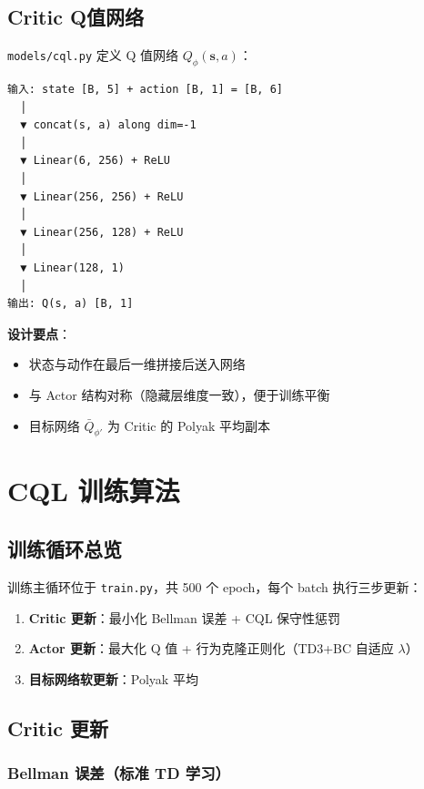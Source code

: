 \documentclass[11pt,a4paper]{ctexart}
\newcommand{\file}[1]{\texttt{#1}}
\begin{document}
\subsection{Critic Q值网络}

\file{models/cql.py} 定义 Q 值网络 $Q_{\phi}(\mathbf{s}, a)$：

\begin{verbatim}
输入: state [B, 5] + action [B, 1] = [B, 6]
  │
  ▼ concat(s, a) along dim=-1
  │
  ▼ Linear(6, 256) + ReLU
  │
  ▼ Linear(256, 256) + ReLU
  │
  ▼ Linear(256, 128) + ReLU
  │
  ▼ Linear(128, 1)
  │
输出: Q(s, a) [B, 1]
\end{verbatim}

\textbf{设计要点}：
\begin{itemize}
    \item 状态与动作在最后一维拼接后送入网络
    \item 与 Actor 结构对称（隐藏层维度一致），便于训练平衡
    \item 目标网络 $\bar{Q}_{\phi'}$ 为 Critic 的 Polyak 平均副本
\end{itemize}

\newpage

\section{CQL 训练算法}

\subsection{训练循环总览}

训练主循环位于 \file{train.py}，共 500 个 epoch，每个 batch 执行三步更新：

\begin{enumerate}
    \item \textbf{Critic 更新}：最小化 Bellman 误差 + CQL 保守性惩罚
    \item \textbf{Actor 更新}：最大化 Q 值 + 行为克隆正则化（TD3+BC 自适应 $\lambda$）
    \item \textbf{目标网络软更新}：Polyak 平均
\end{enumerate}

\subsection{Critic 更新}

\subsubsection{Bellman 误差（标准 TD 学习）}
\end{document}
